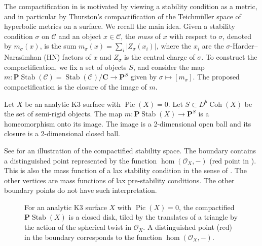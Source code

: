 \documentclass{amsart}
\begin{document}
The compactification in \cite{bap.deo.lic:20} is motivated by viewing a stability condition as a metric, and in particular by Thurston's compactification of the Teichm\"uller space of hyperbolic metrics on a surface.
We recall the main idea.
Given a stability condition \(\sigma\) on \(\mathcal{C}\) and an object \(x \in \mathcal{C}\), the \emph{mass} of \(x\) with respect to \(\sigma\), denoted by \(m_{\sigma}(x)\), is the sum
\( m_{\sigma}(x) = \sum_i |Z_{\sigma}(x_i)|\),
where the \(x_i\) are the \(\sigma\)-Harder--Narasimhan (HN) factors of \(x\) and \(Z_{\sigma}\) is the central charge of \(\sigma\).
To construct the compactification, we fix a set of objects \(S\), and consider the map
\(m \colon \mathbf{P} \operatorname{Stab}(\mathcal{C}) = \operatorname{Stab}(\mathcal{C}) / \mathbf{C} \to \mathbf{P}^S\)
given by \(\sigma \mapsto [m_{\sigma}]\).
The proposed compactification is the closure of the image of \(m\).
\begin{theorem}\label{thm:main}
  Let \(X\) be an analytic K3 surface with \(\operatorname{Pic}(X) = 0\).
  Let \(S \subset D^b\operatorname{Coh} (X)\) be the set of semi-rigid objects.
  The map \(m \colon \mathbf{P} \operatorname{Stab}(X) \to \mathbf{P}^S\) is a homeomorphism onto its image.
  The image is a 2-dimensional open ball and its closure is a 2-dimensional closed ball.
\end{theorem}
See  for an illustration of the compactified stability space.
The boundary contains a distinguished point represented by the function \(\hom(\mathcal{O}_X,-)\) (red point in ).
This is also the mass function of a lax stability condition in the sense of \cite{bro.pau.plo.ea:22}.
The other vertices are mass functions of lax pre-stability conditions.
The other boundary points do not have such interpretation.
\begin{figure}[ht]
  \centering
    \caption{For an analytic K3 surface \(X\) with \(\operatorname{Pic}(X)= 0\), the compactified \(\mathbf{P} \operatorname{Stab}(X)\) is a closed disk, tiled by the translates of a triangle by the action of the spherical twist in \(\mathcal{O}_X\).  A distinguished point (red) in the boundary corresponds to the function \(\hom(\mathcal{O}_X, -)\).}
    \label{fig:disk}
  \end{figure}
\end{document}
